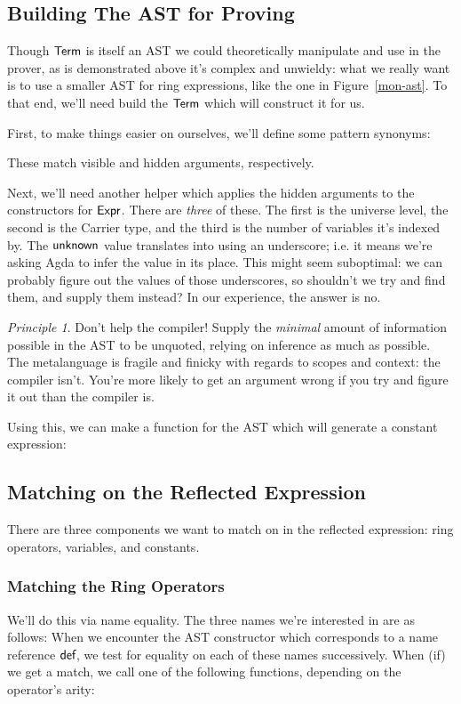 \documentclass[draft, twocolumn]{article}
\theoremstyle{definition}
\theoremstyle{remark}
\newtheorem{principle}{Principle}[section]
\begin{document}
\subsection{Building The AST for Proving}
Though \(\AgdaDatatype{Term}\) is itself an AST we could theoretically
manipulate and use in the prover, as is demonstrated above it's complex and
unwieldy: what we really want is to use a smaller AST for ring expressions, like
the one in Figure~\ref{mon-ast}. To that end, we'll need build the
\(\AgdaDatatype{Term}\) which will construct it for us.

First, to make things easier on ourselves, we'll define some pattern synonyms:

These match visible and hidden arguments, respectively.

Next, we'll need another helper which applies the hidden arguments to the
constructors for \(\AgdaDatatype{Expr}\). There are \emph{three} of these. The
first is the universe level, the second is the Carrier type, and the third is
the number of variables it's indexed by.
The \(\AgdaInductiveConstructor{unknown}\) value translates into using an
underscore; i.e. it means we're asking Agda to infer the value in its place.
This might seem suboptimal: we can probably figure out the values of those
underscores, so shouldn't we try and find them, and supply them instead? In our
experience, the answer is no.

\begin{principle}{Don't help the compiler!}
  Supply the \emph{minimal} amount of information possible in the AST to be
  unquoted, relying on inference as much as possible. The metalanguage is
  fragile and finicky with regards to scopes and context: the compiler isn't.
  You're more likely to get an argument wrong if you try and figure it out than
  the compiler is.
\end{principle}

Using this, we can make a function for the AST which will generate a constant
expression:
\subsection{Matching on the Reflected Expression}
There are three components we want to match on in the reflected expression: ring
operators, variables, and constants.
\subsubsection{Matching the Ring Operators}
We'll do this via name equality. The three names we're interested in are as
follows:
When we encounter the AST constructor which corresponds to a name reference
\(\AgdaInductiveConstructor{def}\), we test for equality on each of these names
successively. When (if) we get a match, we call one of the following functions,
depending on the operator's arity:
\end{document}
